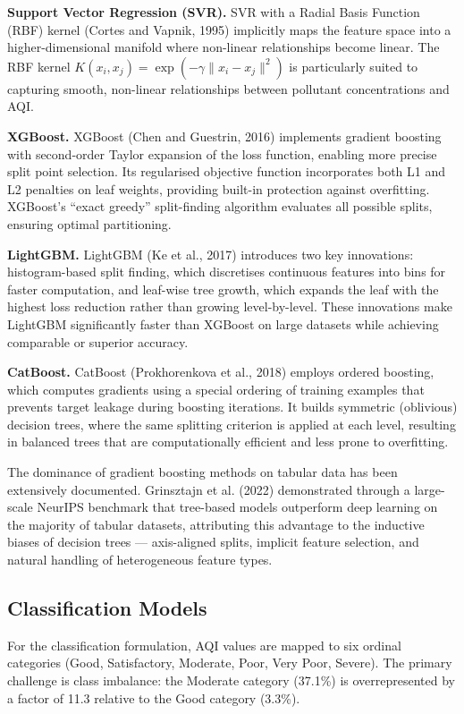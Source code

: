 \documentclass[12pt,a4paper]{report}
\begin{document}
\textbf{Support Vector Regression (SVR).} SVR with a Radial Basis Function (RBF) kernel (Cortes and Vapnik, 1995) implicitly maps the feature space into a higher-dimensional manifold where non-linear relationships become linear. The RBF kernel $K(x_i, x_j) = \exp(-\gamma \|x_i - x_j\|^2)$ is particularly suited to capturing smooth, non-linear relationships between pollutant concentrations and AQI.

\textbf{XGBoost.} XGBoost (Chen and Guestrin, 2016) implements gradient boosting with second-order Taylor expansion of the loss function, enabling more precise split point selection. Its regularised objective function incorporates both L1 and L2 penalties on leaf weights, providing built-in protection against overfitting. XGBoost's ``exact greedy'' split-finding algorithm evaluates all possible splits, ensuring optimal partitioning.

\textbf{LightGBM.} LightGBM (Ke et al., 2017) introduces two key innovations: histogram-based split finding, which discretises continuous features into bins for faster computation, and leaf-wise tree growth, which expands the leaf with the highest loss reduction rather than growing level-by-level. These innovations make LightGBM significantly faster than XGBoost on large datasets while achieving comparable or superior accuracy.

\textbf{CatBoost.} CatBoost (Prokhorenkova et al., 2018) employs ordered boosting, which computes gradients using a special ordering of training examples that prevents target leakage during boosting iterations. It builds symmetric (oblivious) decision trees, where the same splitting criterion is applied at each level, resulting in balanced trees that are computationally efficient and less prone to overfitting.

The dominance of gradient boosting methods on tabular data has been extensively documented. Grinsztajn et al. (2022) demonstrated through a large-scale NeurIPS benchmark that tree-based models outperform deep learning on the majority of tabular datasets, attributing this advantage to the inductive biases of decision trees --- axis-aligned splits, implicit feature selection, and natural handling of heterogeneous feature types.

\subsection{Classification Models}

For the classification formulation, AQI values are mapped to six ordinal categories (Good, Satisfactory, Moderate, Poor, Very Poor, Severe). The primary challenge is class imbalance: the Moderate category (37.1\%) is overrepresented by a factor of 11.3 relative to the Good category (3.3\%).
\end{document}
